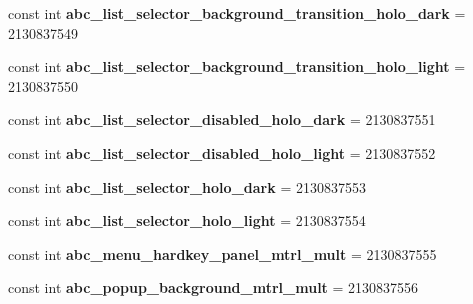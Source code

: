 \begin{DoxyCompactItemize}
const int {\bfseries abc\+\_\+list\+\_\+selector\+\_\+background\+\_\+transition\+\_\+holo\+\_\+dark} = 2130837549
\item 
\mbox{\label{class_pinned_app_1_1_droid_1_1_resource_1_1_drawable_aaef75276d507131230851bca128c479f}} 
const int {\bfseries abc\+\_\+list\+\_\+selector\+\_\+background\+\_\+transition\+\_\+holo\+\_\+light} = 2130837550
\item 
\mbox{\label{class_pinned_app_1_1_droid_1_1_resource_1_1_drawable_a035d0883c46da508840de98310d2102b}} 
const int {\bfseries abc\+\_\+list\+\_\+selector\+\_\+disabled\+\_\+holo\+\_\+dark} = 2130837551
\item 
\mbox{\label{class_pinned_app_1_1_droid_1_1_resource_1_1_drawable_a410ba4fcf4ec0e794ec95fc67097d063}} 
const int {\bfseries abc\+\_\+list\+\_\+selector\+\_\+disabled\+\_\+holo\+\_\+light} = 2130837552
\item 
\mbox{\label{class_pinned_app_1_1_droid_1_1_resource_1_1_drawable_a8b697f5f38689c5fdee3ce6de5753049}} 
const int {\bfseries abc\+\_\+list\+\_\+selector\+\_\+holo\+\_\+dark} = 2130837553
\item 
\mbox{\label{class_pinned_app_1_1_droid_1_1_resource_1_1_drawable_ad2d739e96819e73092e54f4b73244163}} 
const int {\bfseries abc\+\_\+list\+\_\+selector\+\_\+holo\+\_\+light} = 2130837554
\item 
\mbox{\label{class_pinned_app_1_1_droid_1_1_resource_1_1_drawable_aa96e5904fb7afd281b88576529f4c9b2}} 
const int {\bfseries abc\+\_\+menu\+\_\+hardkey\+\_\+panel\+\_\+mtrl\+\_\+mult} = 2130837555
\item 
\mbox{\label{class_pinned_app_1_1_droid_1_1_resource_1_1_drawable_aef56b1057965ec0929a7b43c71fa8291}} 
const int {\bfseries abc\+\_\+popup\+\_\+background\+\_\+mtrl\+\_\+mult} = 2130837556
\item 
\mbox{\label{class_pinned_app_1_1_droid_1_1_resource_1_1_drawable_ac9bbd1b080f69575581857247337e4a7}} 

\end{DoxyCompactItemize}
